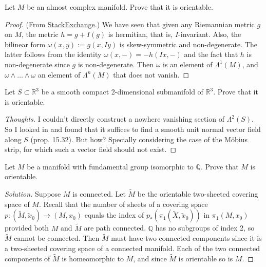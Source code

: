 \documentclass{article}
\newcommand{\R}{\mathbb{R}}
\newcommand{\Q}{\mathbb{Q}}
\begin{document}
\begin{exercise}
	 Let $M$ be an almost complex manifold. Prove that it is
	orientable.
\end{exercise}
\begin{proof}
	(From \href{https://math.stackexchange.com/questions/1817959/almost-complex-manifolds-are-orientable}{StackExchange}.) We have seen that given any Riemannian metric $g$ on $M$, the metric $h=g+I(g)$ is hermitian, that is, $I$-invariant. Also, the bilinear form $\omega(x,y):=g(x,Iy)$ is skew-symmetric and non-degenerate. The latter follows from the identity $\omega(x,-)=-h(Ix,-)$ and the fact that $h$ is non-degenerate since $g$ is non-degenerate. Then $\omega$ is an element of $\Lambda^1(M)$, and $\omega\wedge\ldots\wedge\omega$ an element of $\Lambda^n(M)$ that does not vanish.
\end{proof}
\begin{exercise}
	Let $S \subset \R^3$ be a smooth compact 2-dimensional submanifold of $\R^3$. Prove that it is orientable.
\end{exercise}
\begin{proof}[Thoughts]
	I couldn't directly construct a nowhere vanishing section of $\Lambda^2(S)$. So I looked in \cite{lee} and found that it suffices to find a smooth unit normal vector field along $S$ (prop. 15.32). But how? Specially considering the case of the Möbius strip, for which such a vector field should not exist.
\end{proof}
\begin{exercise}
	Let $M$ be a manifold with fundamental group isomorphic to $\Q$. Prove that $M$ is orientable.
\end{exercise}
\begin{proof}[Solution]
	Suppose $M$ is connected. Let $\tilde{M}$ be the orientable two-sheeted covering space of $M$. Recall that the number of sheets of a covering space $p:(\tilde{M},\tilde{x}_0)\to(M,x_0)$ equals the index of $p_*(\pi_1(\tilde{X},\tilde{x}_0))$ in $\pi_1(M,x_0)$ provided both $M$ and $\tilde{M}$ are path connected. $\Q$ has no subgroups of index 2, so $\tilde{M}$ cannot be connected. Then $\tilde{M}$ must have two connected components since it is a two-sheeted covering space of a connected manifold. Each of the two connected components of $\tilde{M}$ is homeomorphic to $M$, and since $\tilde{M}$ is orientable so is $M$.
\end{proof}
\end{document}
